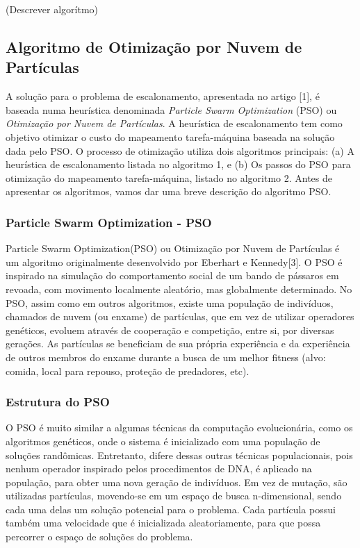 \documentclass[a4paper,10pt, draft]{article}
\begin{document}
(Descrever algorítmo)

\subsection{Algoritmo de Otimização por Nuvem de Partículas}

A solução para o problema de escalonamento, apresentada no artigo [1], é baseada numa heurística 
denominada \emph{Particle Swarm Optimization} (PSO) ou \emph{Otimização por Nuvem de Partículas}. A heurística de 
escalonamento tem como objetivo otimizar 
o custo do mapeamento tarefa-máquina baseada na solução dada pelo PSO. O processo de otimização utiliza 
dois algoritmos principais: (a) A heurística de escalonamento listada no algoritmo 1, e (b) Os passos do PSO 
para otimização do mapeamento tarefa-máquina, listado no algoritmo 2. Antes de apresentar os algoritmos, vamos 
dar uma breve descrição do algoritmo PSO.

\subsubsection{Particle Swarm Optimization - PSO}

Particle Swarm Optimization(PSO) ou Otimização por Nuvem de Partículas é um algoritmo originalmente 
desenvolvido por Eberhart e Kennedy[3]. O PSO é inspirado na simulação do comportamento social de um 
bando de pássaros em revoada, com movimento localmente aleatório, mas globalmente determinado. No PSO, 
assim como em outros algoritmos, existe uma população de indivíduos, chamados de nuvem (ou enxame) de 
partículas, que em vez de utilizar operadores genéticos, evoluem através de cooperação e competição, entre si, 
por diversas gerações. As partículas se beneficiam de sua própria experiência e da experiência de outros membros 
do enxame durante a busca de um melhor fitness (alvo: comida, local para repouso, proteção de predadores, etc).

\subsubsection{Estrutura do PSO}

O PSO é muito similar a algumas técnicas da computação evolucionária, como os algoritmos genéticos, onde o 
sistema é inicializado com uma população de soluções randômicas. Entretanto, difere dessas outras técnicas 
populacionais, pois nenhum operador inspirado pelos procedimentos de DNA, é aplicado na população, para obter 
uma nova geração de indivíduos. Em vez de mutação, são utilizadas partículas, movendo-se em um espaço de busca 
n-dimensional, sendo cada uma delas um solução potencial para o problema. Cada partícula possui também uma 
velocidade que é inicializada aleatoriamente, para que possa percorrer o espaço de soluções do problema.
\end{document}
